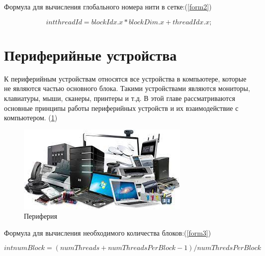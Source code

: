 \documentclass[a4paper, 14pt]{report}
\begin{document}
	Формула для вычисления глобального номера нити в сетке:(\ref{form2})
	
	\begin{equation}
		int threadId = blockIdx.x *blockDim.x + threadIdx.x;
		\label{form2}
	\end{equation}

		\section{Периферийные устройства}
	К периферийным устройствам относятся все устройства в компьютере, которые не являются частью основного блока. Такими устройствами являются мониторы, клавиатуры, мыши, сканеры, принтеры и т.д. В этой главе рассматриваются основные принципы работы периферийных устройств и их взаимодействие с компьютером. (\ref{cuda3})
	
	\begin{figure}[h]
		\centering
		\includegraphics[scale=0.7]{ap.png}
		\caption{Периферия}
		\label{cuda3}
	\end{figure}
	
	Формула для вычисления необходимого количества блоков:(\ref{form3})
	
	\begin{equation}
		int numBlock = (numThreads + numThreadsPerBlock - 1) / numThredsPerBlock
		\label{form3}
	\end{equation}
	
	
	
\end{document}
